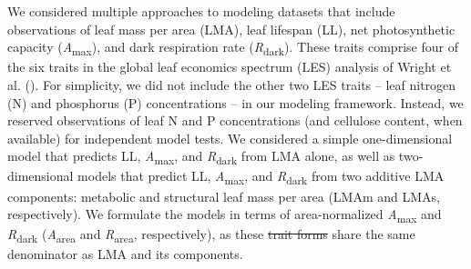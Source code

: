 \documentclass[
  12pt,
  letterpaper,
  DIV=11,
  numbers=noendperiod]{scrartcl}
\providecommand{\DIFadd}[1]{{\protect\color{blue}\uwave{#1}}} %
\providecommand{\DIFdel}[1]{{\protect\color{red}\sout{#1}}}                      %
\providecommand{\DIFaddbegin}{} %
\providecommand{\DIFaddend}{} %
\providecommand{\DIFdelbegin}{} %
\providecommand{\DIFdelend}{} %
\newcommand{\DIFscaledelfig}{0.5}
\newlength{\DIFdelgraphicswidth} %
\newlength{\DIFdelgraphicsheight} %
\newcommand{\DIFaddincludegraphics}[2][]{{\color{blue}\fbox{\DIFOincludegraphics[#1]{#2}}}} %
\newcommand{\DIFdelincludegraphics}[2][]{%
\sbox{\DIFdelgraphicsbox}{\DIFOincludegraphics[#1]{#2}}%
\settoboxwidth{\DIFdelgraphicswidth}{\DIFdelgraphicsbox} %
\settoboxtotalheight{\DIFdelgraphicsheight}{\DIFdelgraphicsbox} %
\scalebox{\DIFscaledelfig}{%
\parbox[b]{\DIFdelgraphicswidth}{\usebox{\DIFdelgraphicsbox}\\[-\baselineskip] \rule{\DIFdelgraphicswidth}{0em}}\llap{\resizebox{\DIFdelgraphicswidth}{\DIFdelgraphicsheight}{%
\setlength{\unitlength}{\DIFdelgraphicswidth}%
\begin{picture}(1,1)%
\thicklines\linethickness{2pt} %
{\color[rgb]{1,0,0}\put(0,0){\framebox(1,1){}}}%
{\color[rgb]{1,0,0}\put(0,0){\line( 1,1){1}}}%
{\color[rgb]{1,0,0}\put(0,1){\line(1,-1){1}}}%
\end{picture}%
}\hspace*{3pt}}} %
} %
\DeclareRobustCommand{\DIFaddbegin}{\DIFOaddbegin \let\includegraphics\DIFaddincludegraphics} %
\DeclareRobustCommand{\DIFaddend}{\DIFOaddend \let\includegraphics\DIFOincludegraphics} %
\DeclareRobustCommand{\DIFdelbegin}{\DIFOdelbegin \let\includegraphics\DIFdelincludegraphics} %
\DeclareRobustCommand{\DIFdelend}{\DIFOaddend \let\includegraphics\DIFOincludegraphics} %
\begin{document}
We considered multiple approaches to modeling datasets that include
observations of leaf mass per area (LMA), leaf lifespan (LL), net
photosynthetic capacity (\emph{A}\textsubscript{max}), and dark
respiration rate (\emph{R}\textsubscript{dark}). These traits comprise
four of the six traits in the global leaf economics spectrum (LES)
analysis of Wright et al. (). For
simplicity, we did not include the other two LES traits -- leaf nitrogen
(N) and phosphorus (P) concentrations -- in our modeling framework.
Instead, we reserved observations of leaf N and P concentrations (and
cellulose content, when available) for independent model tests. We
considered a simple one-dimensional model that predicts LL,
\emph{A}\textsubscript{max}, and \emph{R}\textsubscript{dark} from LMA
alone, as well as two-dimensional models that predict LL,
\emph{A}\textsubscript{max}, and \emph{R}\textsubscript{dark} from two
additive LMA components: metabolic and structural leaf mass per area
(LMAm and LMAs, respectively). We formulate the models in terms of
area-normalized \emph{A}\textsubscript{max} and
\emph{R}\textsubscript{dark} (\emph{A}\textsubscript{area} and
\emph{R}\textsubscript{area}, respectively), as these \DIFdelbegin \DIFdel{trait forms }\DIFdelend \DIFaddbegin \DIFadd{area-normalized
traits }\DIFaddend share the same denominator as LMA and its components.
\end{document}
